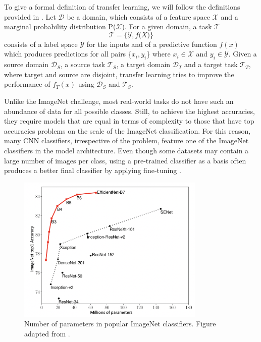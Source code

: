 To give a formal definition of transfer learning, we will follow the definitions provided in \citep{transferSurvey2010}. 
Let $\mathcal{D}$ be a domain, which consists of a feature space $\mathcal{X}$ and a marginal probability distribution P($\mathcal{X}$). 
For a given domain, a task $\mathcal{T}$ \[\mathcal{T} = \{\mathcal{Y}, f\mathcal(X)\}\] \noindent consists of a label space $\mathcal{Y}$ for the inputs and of a predictive function $f(x)$ which produces predictions for all pairs \{$x_i, y_i$\} where $x_i \in \mathcal{X}$ and $y_i \in \mathcal{Y}$. 
Given a source domain $\mathcal{D}_S$, a source task $\mathcal{T}_S$, a target domain $\mathcal{D}_T$ and a target task $\mathcal{T}_T$, where target and source are disjoint, transfer learning tries to improve the performance of $f_T(x)$ using $\mathcal{D}_S$ and $\mathcal{T}_S$.

Unlike the ImageNet challenge, most real-world tasks do not have such an abundance of data for all possible classes. Still, to achieve the highest accuracies, they require models that are equal in terms of complexity to those that have top accuracies problems on the scale of the ImageNet classification. For this reason, many CNN classifiers, irrespective of the problem, feature one of the ImageNet classifiers in the model architecture. Even though some datasets may contain a large number of images per class, using a pre-trained classifier as a basis often produces a better final classifier by applying fine-tuning \citep{betterTransfer}.

\begin{figure}[h!] 
\centering 
\includegraphics[width=0.8\textwidth]{imgs/imagenet-own.png}
\caption{Number of parameters in popular ImageNet classifiers. Figure adapted from \citep{efficientNet}.\label{fig:params}}
\end{figure}

